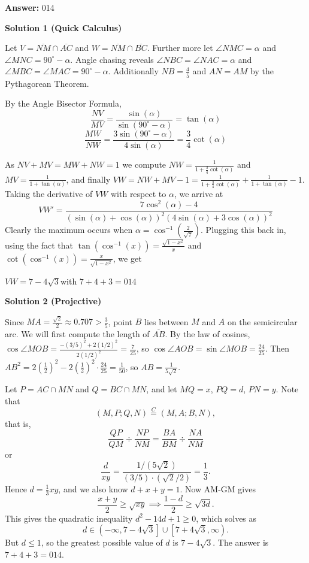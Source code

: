 \begin{enumerate}
 
 \textbf{Answer: }014



\textbf{Solution 1 (Quick Calculus)}

Let $V = \overline{NM} \cap \overline{AC}$ and $W = \overline{NM} \cap \overline{BC}$. Further more let $\angle NMC = \alpha$ and $\angle MNC = 90^\circ - \alpha$. Angle chasing reveals $\angle NBC = \angle NAC = \alpha$ and $\angle MBC = \angle MAC = 90^\circ - \alpha$. Additionally $NB = \frac{4}{5}$ and $AN = AM$ by the Pythagorean Theorem.

 By the Angle Bisector Formula,
 \[\frac{NV}{MV} = \frac{\sin (\alpha)}{\sin (90^\circ - \alpha)} = \tan (\alpha)\]
 \[\frac{MW}{NW} = \frac{3\sin (90^\circ - \alpha)}{4\sin (\alpha)} = \frac{3}{4} \cot (\alpha)\]

 As $NV + MV =MW + NW = 1$ we compute $NW = \frac{1}{1+\frac{3}{4}\cot(\alpha)}$ and $MV = \frac{1}{1+\tan (\alpha)}$, and finally $VW = NW + MV - 1 =  \frac{1}{1+\frac{3}{4}\cot(\alpha)} + \frac{1}{1+\tan (\alpha)} - 1$. Taking the derivative of $VW$ with respect to $\alpha$, we arrive at
 \[VW' = \frac{7\cos^2 (\alpha) - 4}{(\sin(\alpha) + \cos(\alpha))^2(4\sin(\alpha)+3\cos(\alpha))^2}\]Clearly the maximum occurs when $\alpha = \cos^{-1}\left(\frac{2}{\sqrt{7}}\right)$. Plugging this back in, using the fact that $\tan(\cos^{-1}(x)) = \frac{\sqrt{1-x^2}}{x}$ and $\cot(\cos^{-1}(x)) = \frac{x}{\sqrt{1-x^2}}$, we get

 $VW = 7 - 4\sqrt{3}$with $7 + 4 + 3 = \boxed{014}$




\textbf{Solution 2 (Projective)}

Since $MA = \frac{\sqrt{2}}{2} \approx 0.707 > \frac{3}{5}$, point $B$ lies between $M$ and $A$ on the semicircular arc. We will first compute the length of $\overline{AB}$. By the law of cosines, $\cos \angle MOB = \frac{-(3/5)^2 + 2(1/2)^2}{2(1/2)^2} = \frac{7}{25}$, so $\cos \angle AOB = \sin \angle MOB = \frac{24}{25}$. Then $AB^2 = 2\left(\frac{1}{2}\right)^2 - 2\left(\frac{1}{2}\right)^2 \cdot \frac{24}{25} = \frac{1}{50}$, so $AB = \frac{1}{5\sqrt{2}}$.

 Let $P = AC \cap MN$ and $Q = BC \cap MN$, and let $MQ = x$, $PQ = d$, $PN = y$. Note that
 \[(M, P; Q, N) \stackrel{C}{=} (M, A; B, N),\]that is,
 \[\frac{QP}{QM} \div \frac{NP}{NM} = \frac{BA}{BM} \div \frac{NA}{NM}\]or
 \[\frac{d}{xy} = \frac{1/(5\sqrt{2})}{(3/5) \cdot (\sqrt{2}/2)} = \frac{1}{3}.\]Hence $d = \frac{1}{3}xy$, and we also know $d+x+y=1$. Now AM-GM gives
 \[\frac{x+y}{2} \ge \sqrt{xy} \implies \frac{1-d}{2} \ge \sqrt{3d}.\]This gives the quadratic inequality $d^2 - 14d + 1 \ge 0$, which solves as
 \[d \in \left(-\infty, 7-4\sqrt3\right] \cup \left[7+4\sqrt3, \infty\right).\]But $d \le 1$, so the greatest possible value of $d$ is $7-4\sqrt3$. The answer is $7+4+3=\boxed{014}$.


\end{enumerate}
